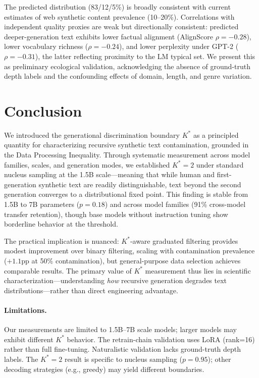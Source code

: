 \documentclass[11pt,a4paper]{article}
\newcommand{\Kstar}{K^{*}}
\begin{document}
The predicted distribution (83/12/5\%) is broadly consistent with current estimates of web synthetic content prevalence (10--20\%).
Correlations with independent quality proxies are weak but directionally consistent: predicted deeper-generation text exhibits lower factual alignment (AlignScore $\rho = -0.28$), lower vocabulary richness ($\rho = -0.24$), and lower perplexity under GPT-2 ($\rho = -0.31$), the latter reflecting proximity to the LM typical set.
We present this as preliminary ecological validation, acknowledging the absence of ground-truth depth labels and the confounding effects of domain, length, and genre variation.

\section{Conclusion}
\label{sec:conclusion}

We introduced the generational discrimination boundary $\Kstar$ as a principled quantity for characterizing recursive synthetic text contamination, grounded in the Data Processing Inequality.
Through systematic measurement across model families, scales, and generation modes, we established $\Kstar=2$ under standard nucleus sampling at the 1.5B scale---meaning that while human and first-generation synthetic text are readily distinguishable, text beyond the second generation converges to a distributional fixed point.
This finding is stable from 1.5B to 7B parameters ($p=0.18$) and across model families (91\% cross-model transfer retention), though base models without instruction tuning show borderline behavior at the threshold.

The practical implication is nuanced: $\Kstar$-aware graduated filtering provides modest improvement over binary filtering, scaling with contamination prevalence ($+1.1$pp at 50\% contamination), but general-purpose data selection achieves comparable results.
The primary value of $\Kstar$ measurement thus lies in scientific characterization---understanding \emph{how} recursive generation degrades text distributions---rather than direct engineering advantage.

\paragraph{Limitations.}
Our measurements are limited to 1.5B--7B scale models; larger models may exhibit different $\Kstar$ behavior.
The retrain-chain validation uses LoRA (rank=16) rather than full fine-tuning.
Naturalistic validation lacks ground-truth depth labels.
The $\Kstar=2$ result is specific to nucleus sampling ($p=0.95$); other decoding strategies (e.g., greedy) may yield different boundaries.
\end{document}
